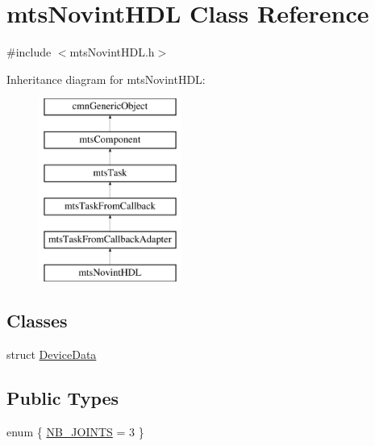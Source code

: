 \hypertarget{classmts_novint_h_d_l}{}\section{mts\+Novint\+H\+D\+L Class Reference}
\label{classmts_novint_h_d_l}


{\ttfamily \#include $<$mts\+Novint\+H\+D\+L.\+h$>$}

Inheritance diagram for mts\+Novint\+H\+D\+L\+:\begin{figure}[H]
\begin{center}
\leavevmode
\includegraphics[height=6.000000cm]{d4/d52/classmts_novint_h_d_l}
\end{center}
\end{figure}
\subsection*{Classes}
\begin{DoxyCompactItemize}
\item 
struct \hyperlink{structmts_novint_h_d_l_1_1_device_data}{Device\+Data}
\end{DoxyCompactItemize}
\subsection*{Public Types}
\begin{DoxyCompactItemize}
\item 
enum \{ \hyperlink{classmts_novint_h_d_l_a8724392125cc09d43cf7f08aa55758c2ac8cb22af32b40caa61bd313eafc3d9f0}{N\+B\+\_\+\+J\+O\+I\+N\+T\+S} = 3
 \}
\end{DoxyCompactItemize}
